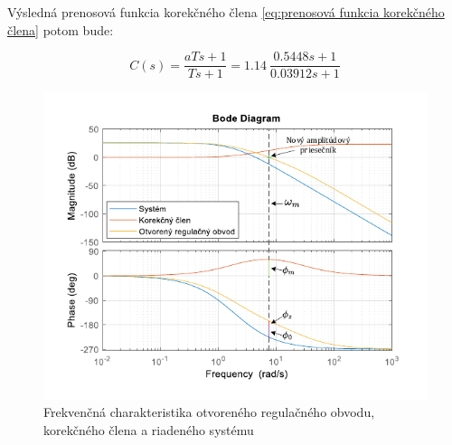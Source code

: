 \documentclass[a4paper,10pt]{article}
\begin{document}
Výsledná prenosová funkcia korekčného člena \eqref{eq:prenosová funkcia korekčného člena} potom bude:

\begin{equation}
 C(s)=\frac{aTs+1}{Ts+1}=1.14\:\frac{0.5448s+1}{0.03912s+1}
\end{equation}

\begin{figure}[ht]
\centering
\includegraphics[width=1.0\textwidth]{OROBode}
\caption{Frekvenčná charakteristika otvoreného regulačného obvodu, korekčného člena a riadeného systému}
\end{figure}
\end{document}
